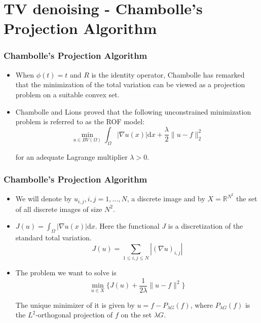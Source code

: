 \documentclass[notheorems,mathserif,table,compress]{beamer}  %
\begin{document}
\section{TV denoising - Chambolle's Projection Algorithm}

%
\begin{frame}
\frametitle{Chambolle's Projection Algorithm} 
\begin{itemize}
\item When $\phi(t)=t$ and $R$ is the identity operator, Chambolle has remarked that the minimization of the total variation can be viewed as a projection problem on a suitable convex set.
\item Chambolle and Lions proved that the following unconstrained minimization problem is referred to as the ROF model:
\newcommand{\ud}{\mathrm{d}}
\begin{displaymath}
\min_{u\in BV(\Omega)}\int_\Omega|\nabla u(x)|\ud x+\frac{\lambda}{2}\parallel u-f \parallel_2^2
\end{displaymath}

for an adequate Lagrange multiplier $\lambda>0$.
\end{itemize}
\end{frame}

%
\begin{frame}
\frametitle{Chambolle's Projection Algorithm} 
\begin{itemize}
\newcommand{\ud}{\mathrm{d}}
\item We will denote by $u_{i,j},i,j=1,\ldots,N$, a discrete image and by $X=\mathbb{R}^{N^2}$ the set of all discrete images of size $N^2$.
\item $J(u)=\int_{\Omega}|\nabla u(x)|\ud x$. Here the functional $J$ is a discretization of the standard total variation.
\begin{displaymath}
J(u)=\sum_{1\leq i,j\leq N}|(\nabla u)_{i,j}|
\end{displaymath}

\item The problem we want to solve is
\begin{displaymath}
\min_{u\in X} \{J(u)+\frac{1}{2\lambda}\parallel u-f \parallel^2\}
\end{displaymath}

The unique minimizer of it is given by $u=f−P_{\lambda G}(f)$, where $P_{\lambda G}(f)$ is the $L^2$-orthogonal projection of $f$ on the set $\lambda G$.
\end{itemize}
\end{frame}
\end{document}
